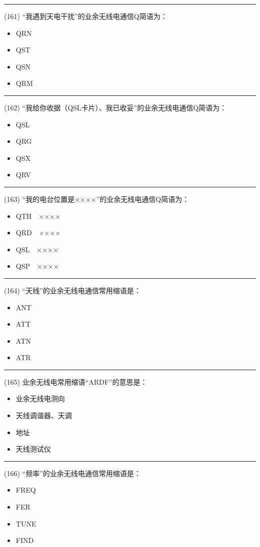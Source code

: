 \documentclass[twocolumn]{ctexart}  %
\begin{document}
\noindent\rule{0.5\textwidth}{1pt}
\heiti (161) “我遇到天电干扰”的业余无线电通信Q简语为： \songti {\color{gray} [LK0294] }
\begin{itemize}
	\item  QRN
	\item  QST
	\item  QSN
	\item  QRM
\end{itemize}


\noindent\rule{0.5\textwidth}{1pt}
\heiti (162) “我给你收据（QSL卡片）、我已收妥”的业余无线电通信Q简语为： \songti {\color{gray} [LK0313] }
\begin{itemize}
	\item  QSL
	\item  QRG
	\item  QSX
	\item  QRV
\end{itemize}


\noindent\rule{0.5\textwidth}{1pt}
\heiti (163) “我的电台位置是××××”的业余无线电通信Q简语为： \songti {\color{gray} [LK0321] }
\begin{itemize}
	\item  QTH　××××
	\item  QRD　××××
	\item  QSL　××××
	\item  QSP　××××
\end{itemize}


\noindent\rule{0.5\textwidth}{1pt}
\heiti (164) “天线”的业余无线电通信常用缩语是： \songti {\color{gray} [LK0331] }
\begin{itemize}
	\item  ANT
	\item  ATT
	\item  ATN
	\item  ATR
\end{itemize}


\noindent\rule{0.5\textwidth}{1pt}
\heiti (165) 业余无线电常用缩语“ARDF”的意思是： \songti {\color{gray} [LK0332] }
\begin{itemize}
	\item  业余无线电测向
	\item  天线调谐器、天调
	\item  地址
	\item  天线测试仪
\end{itemize}


\noindent\rule{0.5\textwidth}{1pt}
\heiti (166) “频率”的业余无线电通信常用缩语是： \songti {\color{gray} [LK0352] }
\begin{itemize}
	\item  FREQ
	\item  FER
	\item  TUNE
	\item  FIND
\end{itemize}
\end{document}
